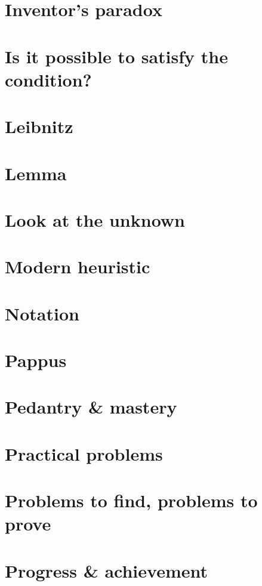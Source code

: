 \documentclass[oneside]{book}
\numberwithin{equation}{section}
\begin{document}
\section*{Inventor's paradox}

\section*{Is it possible to satisfy the condition?}

\section*{Leibnitz}

\section*{Lemma}

\section*{Look at the unknown}

\section*{Modern heuristic}

\section*{Notation}

\section*{Pappus}

\section*{Pedantry \& mastery}

\section*{Practical problems}

\section*{Problems to find, problems to prove}

\section*{Progress \& achievement}
\end{document}

